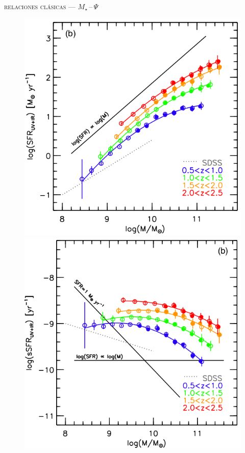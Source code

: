 \documentclass[xcolor=dvipsnames,4pt,hyperref={colorlinks,citecolor=black,linkcolor=black,urlcolor=black}]{beamer}
\begin{document}
\begin{frame}{\textsc{relaciones clásicas --- $M_\star\,$--$\,\Psi$}}

\begin{figure}
\includegraphics[scale=0.6]{img/whitaker2014-1}
\includegraphics[scale=0.6]{img/whitaker2014-2}
\end{figure}

\end{frame}
\end{document}
